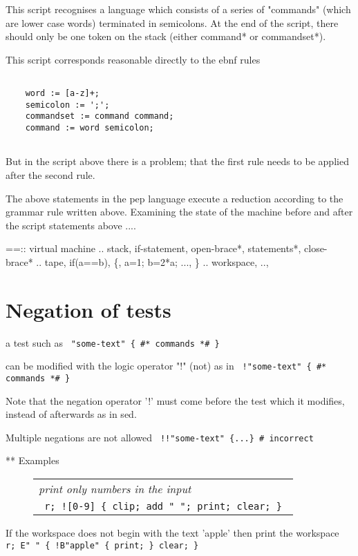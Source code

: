 \documentclass[a4paper,12pt]{article}
\begin{document}
  
  This script recognises a language which consists of a series
  of "commands" (which are lower case words) terminated in semicolons.
  At the end of the script, there should only be one token on the
  stack (either command* or commandset*).

  This script corresponds reasonable directly to the ebnf rules 
 \begin{lstlisting}[breaklines] 

    word := [a-z]+;
    semicolon := ';';
    commandset := command command;
    command := word semicolon;
  
 \end{lstlisting} 


  But in the script above there is a problem; that the first rule
  needs to be applied after the second rule.

  The above statements in the pep language execute a reduction according to
  the grammar rule written above. Examining the state of the machine
  before and after the script statements above ....
  
  ==:: virtual machine
  .. stack, if-statement, open-brace*, statements*, close-brace*
  .. tape, if(a==b), \{, a=1; b=2*a; ..., \}
  .. workspace,
  ..,

\section{Negation of tests}

 a test such as 
 \verb| "some-text" { #* commands *# } |


 can be modified with the logic operator "!" (not) as in 
 \verb| !"some-text" { #* commands *# } |


 Note that the negation operator '!' must come before the test which it
 modifies, instead of afterwards as in sed.

 Multiple negations are not allowed 
 \verb| !!"some-text" {...} # incorrect |

  
** Examples
 \begin{figure}
 \begin{tabular}{ l }
 \emph{ print only numbers in the input  } \\ 
 \verb| r; ![0-9] { clip; add " "; print; clear; } |
 \end{tabular} 
 \end{figure}

 If the workspace does not begin with the text 'apple' then
 print the workspace 
 \verb| r; E" " { !B"apple" { print; } clear; } |
\end{document}
